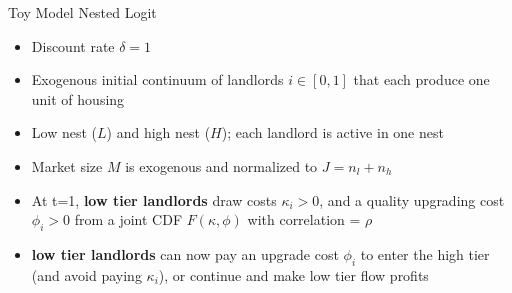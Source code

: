 \documentclass[10pt, xcolor=dvipsnames]{beamer}
\begin{document}
    


    


\begin{frame}{Toy Model Nested Logit}
    \begin{itemize}
        \item Discount rate $\delta =1$
        \item Exogenous initial continuum of landlords $i \in [0,1]$ that each produce one unit of housing
        \item Low nest ($L$) and high nest ($H$); each landlord is active in one nest
        \item Market size $M$ is exogenous and normalized to $J=n_l +n_h$
        \item At t=1, \textbf{low tier landlords} draw costs $\kappa_i>0$, and a quality upgrading cost $\phi_i>0$ from a joint CDF $F(\kappa,\phi)$ with correlation = $\rho$
        \item \textbf{low tier landlords} can now pay an upgrade cost $\phi_i$ to enter the high tier (and avoid paying $\kappa_i$), or continue and make low tier flow profits
    \end{itemize}    
\end{frame}
\end{document}

